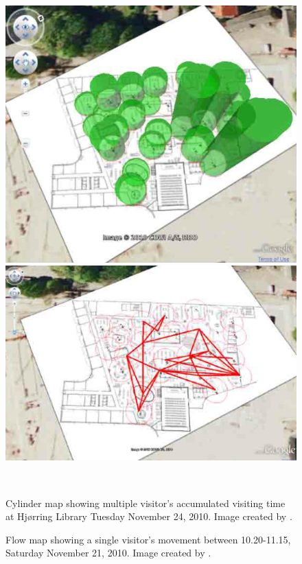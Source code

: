 \begin{figure}[htbp] \centering
\begin{minipage}[b]{0.45\textwidth} \centering
\includegraphics[width=1.00\textwidth]{Pictures/HjoerringLibrary/library_cylinder_diagram_24Nov.png} %
\end{minipage} \hfill
\begin{minipage}[b]{0.45\textwidth} \centering
\includegraphics[width=1.00\textwidth]{Pictures/HjoerringLibrary/library_flow_Nov21.png} %
\end{minipage} \\ %
\begin{minipage}[t]{0.45\textwidth}
\caption{Cylinder map showing multiple visitor's accumulated visiting time at Hj{\o}rring Library Tuesday November 24, 2010. Image created by \citep{hjoerring_study}.} %
\label{fig:library_cylindermap}
\end{minipage} \hfill
\begin{minipage}[t]{0.45\textwidth}
\caption{Flow map showing a single visitor's movement between 10.20-11.15, Saturday November 21, 2010. Image created by \citep{hjoerring_study}.} %
\label{fig:library_flowmap}
\end{minipage}
\end{figure}

